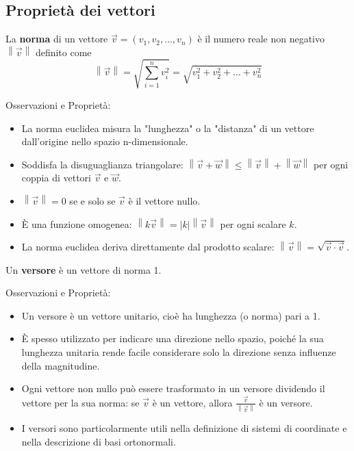 \documentclass{book}
\newcommand{\norm}[1]{\left\lVert#1\right\rVert}
\begin{document}
\subsection{Proprietà dei vettori}
\begin{definition}
    La \textbf{norma} di un vettore \(\vec{v}=(v_1, v_2, \ldots, v_n)\) è il numero reale non negativo \(\norm{\vec{v}}\) definito come
    \[
        \norm{\vec{v}} = \sqrt{\sum_{i=1}^{n} v_i^2} = \sqrt{v_1^2 + v_2^2 + \ldots + v_n^2}
    \]

    \noindent Osservazioni e Proprietà:
    \begin{itemize}
        \item La norma euclidea misura la "lunghezza" o la "distanza" di un vettore dall'origine nello spazio n-dimensionale.
        \item Soddisfa la disuguaglianza triangolare: \(\norm{\vec{v} + \vec{w}} \leq \norm{\vec{v}} + \norm{\vec{w}}\) per ogni coppia di vettori \(\vec{v}\) e \(\vec{w}\).
        \item \(\norm{\vec{v}} = 0\) se e solo se \(\vec{v}\) è il vettore nullo.
        \item È una funzione omogenea: \(\norm{k\vec{v}} = |k| \norm{\vec{v}}\) per ogni scalare \(k\).
        \item La norma euclidea deriva direttamente dal prodotto scalare: \(\norm{\vec{v}} = \sqrt{\vec{v} \cdot \vec{v}}\).
    \end{itemize}
\end{definition}

\begin{definition}[Versore]
    Un \textbf{versore} è un vettore di norma 1.

    \noindent Osservazioni e Proprietà:
    \begin{itemize}
        \item Un versore è un vettore unitario, cioè ha lunghezza (o norma) pari a 1.
        \item È spesso utilizzato per indicare una direzione nello spazio, poiché la sua lunghezza unitaria rende facile considerare solo la direzione senza influenze della magnitudine.
        \item Ogni vettore non nullo può essere trasformato in un versore dividendo il vettore per la sua norma: se \(\vec{v}\) è un vettore, allora \(\frac{\vec{v}}{\norm{\vec{v}}}\) è un versore.
        \item I versori sono particolarmente utili nella definizione di sistemi di coordinate e nella descrizione di basi ortonormali.
    \end{itemize}
\end{definition}
\end{document}
